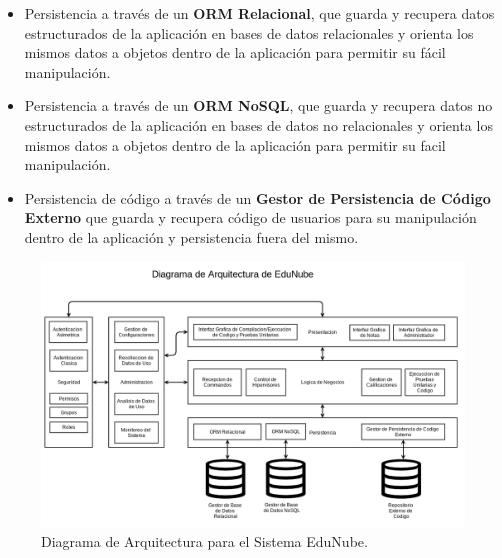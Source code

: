 \begin{itemize}
    \begin{itemize}
    	\item Persistencia a través de un \textbf{ORM Relacional}, que guarda y recupera datos estructurados de la aplicación en bases de datos relacionales y orienta los mismos datos a objetos dentro de la aplicación para permitir su fácil manipulación.
        \item Persistencia a través de un \textbf{ORM NoSQL}, que guarda y recupera datos no estructurados de la aplicación en bases de datos no relacionales y orienta los mismos datos a objetos dentro de la aplicación para permitir su facil manipulación.
        \item Persistencia de código a través de un \textbf{Gestor de Persistencia de Código Externo} que guarda y recupera código de usuarios para su manipulación dentro de la aplicación y persistencia fuera del mismo.
    \end{itemize}
\end{itemize}

\begin{landscape}
	\begin{figure}
	  \begin{center}
	    \includegraphics[width=1.0\textwidth]{Figures/arq_en.png}
	  \end{center}
	  \caption{Diagrama de Arquitectura para el Sistema EduNube.}
	  \label{arq_en}
	\end{figure}

\end{landscape}

